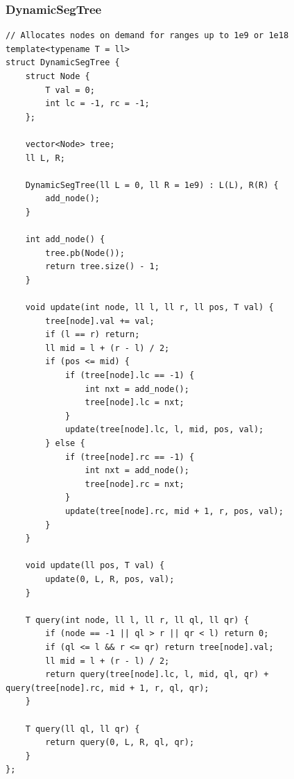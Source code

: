 \documentclass[9pt,a4paper,twocolumn]{extarticle}
\begin{document}
\subsubsection{DynamicSegTree}
\nopagebreak
\begin{lstlisting}
// Allocates nodes on demand for ranges up to 1e9 or 1e18
template<typename T = ll>
struct DynamicSegTree {
    struct Node {
        T val = 0;
        int lc = -1, rc = -1;
    };

    vector<Node> tree;
    ll L, R;

    DynamicSegTree(ll L = 0, ll R = 1e9) : L(L), R(R) {
        add_node();
    }

    int add_node() {
        tree.pb(Node());
        return tree.size() - 1;
    }

    void update(int node, ll l, ll r, ll pos, T val) {
        tree[node].val += val;
        if (l == r) return;
        ll mid = l + (r - l) / 2;
        if (pos <= mid) {
            if (tree[node].lc == -1) {
                int nxt = add_node();
                tree[node].lc = nxt;
            }
            update(tree[node].lc, l, mid, pos, val);
        } else {
            if (tree[node].rc == -1) {
                int nxt = add_node();
                tree[node].rc = nxt;
            }
            update(tree[node].rc, mid + 1, r, pos, val);
        }
    }

    void update(ll pos, T val) {
        update(0, L, R, pos, val);
    }

    T query(int node, ll l, ll r, ll ql, ll qr) {
        if (node == -1 || ql > r || qr < l) return 0;
        if (ql <= l && r <= qr) return tree[node].val;
        ll mid = l + (r - l) / 2;
        return query(tree[node].lc, l, mid, ql, qr) + query(tree[node].rc, mid + 1, r, ql, qr);
    }

    T query(ll ql, ll qr) {
        return query(0, L, R, ql, qr);
    }
};
\end{lstlisting}

\filbreak
\end{document}
